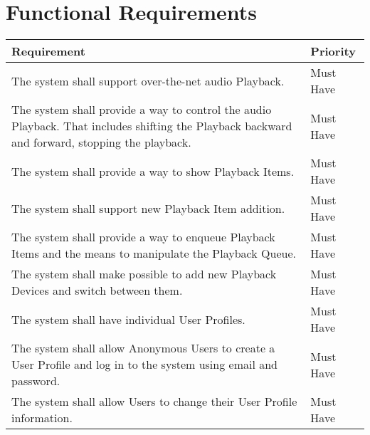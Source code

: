 \section{Functional Requirements}

\begin{table}[h!]
    \centering
    \begin{tabular}{|p{12cm}|p{3cm}|}
        \hline
        \textbf{Requirement}                                                                                                                                            & \textbf{Priority} \\
        \hline
        The system shall support over-the-net audio Playback.                                                                                                           & Must Have         \\
        \hline
        The system shall provide a way to control the audio Playback. That includes shifting the Playback backward and forward, stopping the playback. & Must Have \\
        \hline
        The system shall provide a way to show Playback Items.                                                                                                          & Must Have         \\
        \hline
        The system shall support new Playback Item addition.                                                                                                            & Must Have         \\
        \hline
        The system shall provide a way to enqueue Playback Items and the means to manipulate the Playback Queue. & Must Have \\
        \hline
        The system shall make possible to add new Playback Devices and switch between them. & Must Have \\
        \hline
        The system shall have individual User Profiles.                                                                                                                 & Must Have         \\
        \hline
        The system shall allow Anonymous Users to create a User Profile and log in to the system using email and password. & Must Have \\
        \hline
        The system shall allow Users to change their User Profile information.                                                                                          & Must Have         \\

\end{tabular}
\end{table}
